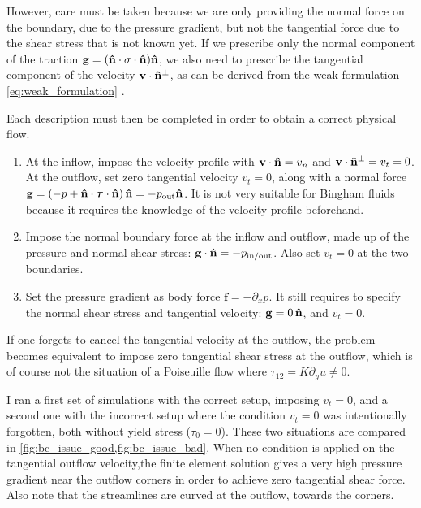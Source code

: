 \documentclass[11 pt]{report}
\begin{document}
However, care must be taken because we are only providing the normal force on the boundary, due to the pressure gradient, but not the tangential force due to the shear stress that is not known yet. If we prescribe only the normal component of the traction $\mathbf{g}=(\mathbf{\hat n}\cdot\mathbf{\sigma}\cdot\mathbf{\hat n})\mathbf{\hat n}$, we also need to prescribe the tangential component of the velocity $\mathbf{v}\cdot\mathbf{\hat n}^\perp$, as can be derived from the weak formulation \cref{eq:weak_formulation} \cite{Bangerth}.

Each description must then be completed in order to obtain a correct physical flow.
\begin{enumerate}[topsep=0pt]
    \setlength{\itemsep}{0pt}
    \item At the inflow, impose the velocity profile with $\mathbf{v} \cdot \mathbf{\hat n} = v_n$ and $\mathbf{v} \cdot \mathbf{\hat n}^\perp = v_t = 0$. At the outflow, set zero tangential velocity $v_t = 0$, along with a normal force $\mathbf{g} = (-p + \mathbf{\hat n}\cdot\boldsymbol\tau\cdot\mathbf{\hat n})\,\mathbf{\hat n} = -p_{\text{out}}\mathbf{\hat n}$. It is not very suitable for Bingham fluids because it requires the knowledge of the velocity profile beforehand.
    \item Impose the normal boundary force at the inflow and outflow, made up of the pressure and normal shear stress: $\mathbf{g} \cdot \mathbf{\hat n} = -p_{\text{in/out}}$. Also set $v_t=0$ at the two boundaries.
    \item Set the pressure gradient as body force $\mathbf{f} = -\partial_x p$. It still requires to specify the normal shear stress and tangential velocity: $\mathbf{g} = 0 \,\mathbf{\hat n}$, and $v_t=0$.
\end{enumerate}

If one forgets to cancel the tangential velocity at the outflow, the problem becomes equivalent to impose zero tangential shear stress at the outflow, which is of course not the situation of a Poiseuille flow where $\tau_{12} = K\partial_y u \neq 0$. 

I ran a first set of simulations with the correct setup, imposing $v_t=0$, and a second one with the incorrect setup where the condition $v_t=0$ was intentionally forgotten, both without yield stress ($\tau_0=0$). These two situations are compared in \cref{fig:bc_issue_good,fig:bc_issue_bad}. When no condition is applied on the tangential outflow velocity,the finite element solution gives a very high pressure gradient near the outflow corners in order to achieve zero tangential shear force. Also note that the streamlines are curved at the outflow, towards the corners.
\end{document}
